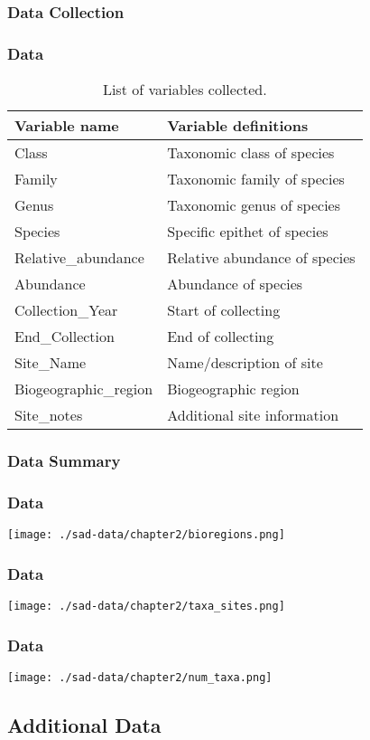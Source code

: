 \documentclass[14pt]{beamer}
\begin{document}
\subsubsection{Data Collection}
\begin{frame}[shrink=30]
\frametitle{Data}
\begin{table}
\begin{tabular}{l|l} 
 Variable name & Variable definitions\\ 
\hline
 Class & Taxonomic class of species \\
 Family & Taxonomic family of species \\
 Genus & Taxonomic genus of species\\
 Species & Specific epithet of species  \\
 Relative\_abundance & Relative abundance of species \\
 Abundance & Abundance of species \\
 Collection\_Year & Start of collecting \\
 End\_Collection & End of collecting \\
 Site\_Name & Name/description of site \\
 Biogeographic\_region & Biogeographic region \\
 Site\_notes & Additional site information \\ 
\end{tabular}
\caption{List of variables collected.}
\end{table}
\end{frame}

\subsubsection{Data Summary}
\begin{frame}{}
\frametitle{Data}
\texttt{[image: ./sad-data/chapter2/bioregions.png]}
\end{frame}

\begin{frame}{}
\frametitle{Data}
\texttt{[image: ./sad-data/chapter2/taxa\_sites.png]}
\end{frame}

\begin{frame}{}
\frametitle{Data}
\texttt{[image: ./sad-data/chapter2/num\_taxa.png]}
\end{frame}



\subsection{Additional Data}
\end{document}

